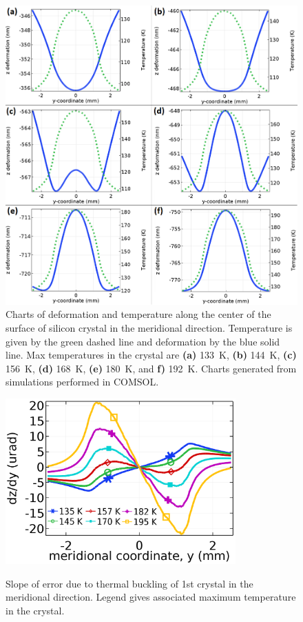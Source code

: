 \documentclass[preprint]{iucr}              %
\begin{document}
\begin{figure}

\caption{Charts of deformation and temperature along the center of the surface of silicon crystal in the meridional direction. Temperature is given by the green dashed line and deformation by the blue solid line. Max temperatures in the crystal are \textbf{(a)} 133~K, \textbf{(b)} 144~K, \textbf{(c)} 156~K, \textbf{(d)} 168~K, \textbf{(e)} 180~K, and \textbf{f)} 192~K. Charts generated from simulations performed in COMSOL.}
\includegraphics[width = \textwidth]{images/deformation.png}

\label{fig:ydeformation}
\end{figure}

\begin{figure}
\caption{Slope of error due to thermal buckling of 1st crystal in the meridional direction. Legend gives associated maximum temperature in the crystal.}
\includegraphics[width = 8.85cm]{images/slope.png}
\label{fig:yslope}
\end{figure}
\end{document}

